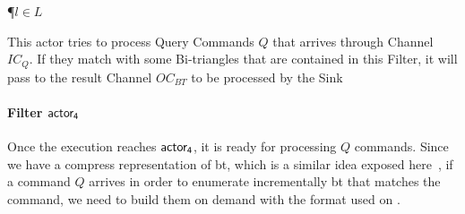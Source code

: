 \begin{algorithm}
\P{$l \in L$}
\FS{$\ati \subseteq \at$}
\BlankLine
{}
\caption{This actor tries to process Query Commands $Q$ that arrives through Channel $IC_Q$. If they match with some Bi-triangles that are contained in this Filter, it will pass to the result Channel $OC_{BT}$ to be processed by the Sink}
\label{algo:act-4}
\end{algorithm}

\paragraph{Filter $\mathsf{actor_4}$} Once the execution reaches $\mathsf{actor_4}$, it is ready for processing $Q$ commands. Since we have a compress representation of \acrshort{bt}, which is a similar idea exposed here~\cite{Lai}, if a command $Q$ arrives in order 
to enumerate incrementally \acrshort{bt} that matches the command, we need to build them on demand with the format used on .

